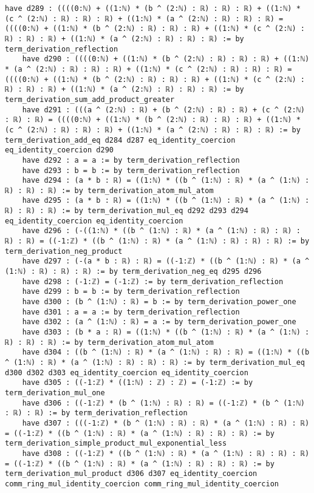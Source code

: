 \documentclass{article}
\begin{document}
\begin{tcolorbox}[colback=white!10, width=\linewidth]
\begin{lstlisting}[language=Lean4]
    have d289 : ((((0:ℕ) + ((1:ℕ) * (b ^ (2:ℕ) : ℝ) : ℝ) : ℝ) + ((1:ℕ) * (c ^ (2:ℕ) : ℝ) : ℝ) : ℝ) + ((1:ℕ) * (a ^ (2:ℕ) : ℝ) : ℝ) : ℝ) = ((((0:ℕ) + ((1:ℕ) * (b ^ (2:ℕ) : ℝ) : ℝ) : ℝ) + ((1:ℕ) * (c ^ (2:ℕ) : ℝ) : ℝ) : ℝ) + ((1:ℕ) * (a ^ (2:ℕ) : ℝ) : ℝ) : ℝ) := by term_derivation_reflection
    have d290 : ((((0:ℕ) + ((1:ℕ) * (b ^ (2:ℕ) : ℝ) : ℝ) : ℝ) + ((1:ℕ) * (a ^ (2:ℕ) : ℝ) : ℝ) : ℝ) + ((1:ℕ) * (c ^ (2:ℕ) : ℝ) : ℝ) : ℝ) = ((((0:ℕ) + ((1:ℕ) * (b ^ (2:ℕ) : ℝ) : ℝ) : ℝ) + ((1:ℕ) * (c ^ (2:ℕ) : ℝ) : ℝ) : ℝ) + ((1:ℕ) * (a ^ (2:ℕ) : ℝ) : ℝ) : ℝ) := by term_derivation_sum_add_product_greater
    have d291 : (((a ^ (2:ℕ) : ℝ) + (b ^ (2:ℕ) : ℝ) : ℝ) + (c ^ (2:ℕ) : ℝ) : ℝ) = ((((0:ℕ) + ((1:ℕ) * (b ^ (2:ℕ) : ℝ) : ℝ) : ℝ) + ((1:ℕ) * (c ^ (2:ℕ) : ℝ) : ℝ) : ℝ) + ((1:ℕ) * (a ^ (2:ℕ) : ℝ) : ℝ) : ℝ) := by term_derivation_add_eq d284 d287 eq_identity_coercion eq_identity_coercion d290
    have d292 : a = a := by term_derivation_reflection
    have d293 : b = b := by term_derivation_reflection
    have d294 : (a * b : ℝ) = ((1:ℕ) * ((b ^ (1:ℕ) : ℝ) * (a ^ (1:ℕ) : ℝ) : ℝ) : ℝ) := by term_derivation_atom_mul_atom
    have d295 : (a * b : ℝ) = ((1:ℕ) * ((b ^ (1:ℕ) : ℝ) * (a ^ (1:ℕ) : ℝ) : ℝ) : ℝ) := by term_derivation_mul_eq d292 d293 d294 eq_identity_coercion eq_identity_coercion
    have d296 : (-((1:ℕ) * ((b ^ (1:ℕ) : ℝ) * (a ^ (1:ℕ) : ℝ) : ℝ) : ℝ) : ℝ) = ((-1:ℤ) * ((b ^ (1:ℕ) : ℝ) * (a ^ (1:ℕ) : ℝ) : ℝ) : ℝ) := by term_derivation_neg_product
    have d297 : (-(a * b : ℝ) : ℝ) = ((-1:ℤ) * ((b ^ (1:ℕ) : ℝ) * (a ^ (1:ℕ) : ℝ) : ℝ) : ℝ) := by term_derivation_neg_eq d295 d296
    have d298 : (-1:ℤ) = (-1:ℤ) := by term_derivation_reflection
    have d299 : b = b := by term_derivation_reflection
    have d300 : (b ^ (1:ℕ) : ℝ) = b := by term_derivation_power_one
    have d301 : a = a := by term_derivation_reflection
    have d302 : (a ^ (1:ℕ) : ℝ) = a := by term_derivation_power_one
    have d303 : (b * a : ℝ) = ((1:ℕ) * ((b ^ (1:ℕ) : ℝ) * (a ^ (1:ℕ) : ℝ) : ℝ) : ℝ) := by term_derivation_atom_mul_atom
    have d304 : ((b ^ (1:ℕ) : ℝ) * (a ^ (1:ℕ) : ℝ) : ℝ) = ((1:ℕ) * ((b ^ (1:ℕ) : ℝ) * (a ^ (1:ℕ) : ℝ) : ℝ) : ℝ) := by term_derivation_mul_eq d300 d302 d303 eq_identity_coercion eq_identity_coercion
    have d305 : ((-1:ℤ) * ((1:ℕ) : ℤ) : ℤ) = (-1:ℤ) := by term_derivation_mul_one
    have d306 : ((-1:ℤ) * (b ^ (1:ℕ) : ℝ) : ℝ) = ((-1:ℤ) * (b ^ (1:ℕ) : ℝ) : ℝ) := by term_derivation_reflection
    have d307 : (((-1:ℤ) * (b ^ (1:ℕ) : ℝ) : ℝ) * (a ^ (1:ℕ) : ℝ) : ℝ) = ((-1:ℤ) * ((b ^ (1:ℕ) : ℝ) * (a ^ (1:ℕ) : ℝ) : ℝ) : ℝ) := by term_derivation_simple_product_mul_exponential_less
    have d308 : ((-1:ℤ) * ((b ^ (1:ℕ) : ℝ) * (a ^ (1:ℕ) : ℝ) : ℝ) : ℝ) = ((-1:ℤ) * ((b ^ (1:ℕ) : ℝ) * (a ^ (1:ℕ) : ℝ) : ℝ) : ℝ) := by term_derivation_mul_product d306 d307 eq_identity_coercion comm_ring_mul_identity_coercion comm_ring_mul_identity_coercion

\end{lstlisting}
\end{tcolorbox}
\end{document}
